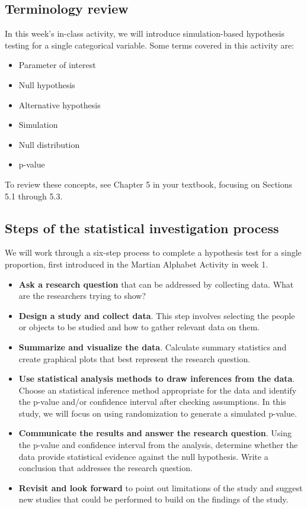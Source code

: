 \documentclass[
]{report}
\begin{document}
\hypertarget{terminology-review-5}{%
\subsection{Terminology review}\label{terminology-review-5}}

In this week's in-class activity, we will introduce simulation-based hypothesis testing for a single categorical variable. Some terms covered in this activity are:

\begin{itemize}
\item
  Parameter of interest
\item
  Null hypothesis
\item
  Alternative hypothesis
\item
  Simulation
\item
  Null distribution
\item
  p-value
\end{itemize}

To review these concepts, see Chapter 5 in your textbook, focusing on Sections 5.1 through 5.3.

\hypertarget{steps-of-the-statistical-investigation-process-1}{%
\subsection{Steps of the statistical investigation process}\label{steps-of-the-statistical-investigation-process-1}}

We will work through a six-step process to complete a hypothesis test for a single proportion, first introduced in the Martian Alphabet Activity in week 1.

\begin{itemize}
\item
  \textbf{Ask a research question} that can be addressed by collecting data. What are the researchers trying to show?
\item
  \textbf{Design a study and collect data}. This step involves selecting the people or objects to be studied and how to gather relevant data on them.
\item
  \textbf{Summarize and visualize the data}. Calculate summary statistics and create graphical plots that best represent the research question.
\item
  \textbf{Use statistical analysis methods to draw inferences from the data}. Choose an statistical inference method appropriate for the data and identify the p-value and/or confidence interval after checking assumptions. In this study, we will focus on using randomization to generate a simulated p-value.
\item
  \textbf{Communicate the results and answer the research question}. Using the p-value and confidence interval from the analysis, determine whether the data provide statistical evidence against the null hypothesis. Write a conclusion that addresses the research question.
\item
  \textbf{Revisit and look forward} to point out limitations of the study and suggest new studies that could be performed to build on the findings of the study.
\end{itemize}
\end{document}
